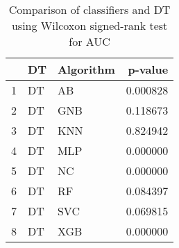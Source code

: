 \begin{table}
\footnotesize
\caption{Comparison of classifiers and DT using Wilcoxon signed-rank test for AUC}
\label{tab:DT wilcoxon AUC comparison}
\begin{tabular}{lllr}
\hline
 & DT & Algorithm & p-value \\
\hline
1 & DT & AB & 0.000828 \\
2 & DT & GNB & 0.118673 \\
3 & DT & KNN & 0.824942 \\
4 & DT & MLP & 0.000000 \\
5 & DT & NC & 0.000000 \\
6 & DT & RF & 0.084397 \\
7 & DT & SVC & 0.069815 \\
8 & DT & XGB & 0.000000 \\
\hline
\end{tabular}
\end{table}
